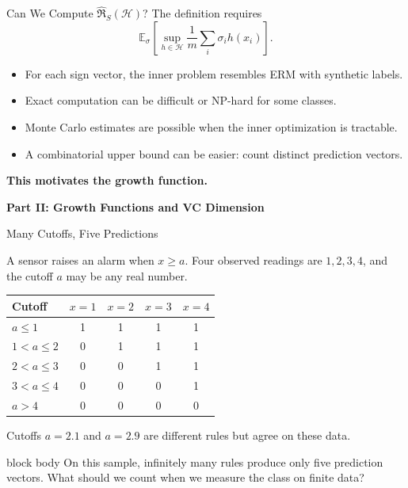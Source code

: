 \documentclass[aspectratio=169,10pt]{beamer}
\newcommand{\Hc}{\mathcal{H}}
\newcommand{\RadS}{\widehat{\mathfrak{R}}_S}
\newcommand{\E}{\mathbb{E}}
\newcommand{\SectionSlide}[2]{%
  \begin{frame}
    \centering
    \vfill
    {\color{slideorange}\fontsize{29}{34}\selectfont\bfseries #1\par}
    \vspace{0.38cm}
    {\color{midgray}\fontsize{16}{21}\selectfont #2\par}
    \vfill
  \end{frame}
}
\newcommand{\KeyBox}[1]{%
  \begin{beamercolorbox}[rounded=true,sep=0.22cm,wd=\linewidth]{block body}
    #1
  \end{beamercolorbox}%
}
\begin{document}
\begin{frame}[t]{Can We Compute $\RadS(\Hc)$?}
  \vspace{0.05cm}
  The definition requires
  \[
    \E_\sigma\left[
      \sup_{h\in\Hc}\frac1m\sum_i\sigma_i h(x_i)
    \right].
  \]
  \begin{itemize}
    \setlength{\itemsep}{0.14cm}
    \item For each sign vector, the inner problem resembles ERM with synthetic labels.
    \item Exact computation can be difficult or NP-hard for some classes.
    \item Monte Carlo estimates are possible when the inner optimization is tractable.
    \item A combinatorial upper bound can be easier: count distinct prediction vectors.
  \end{itemize}
  \vspace{0.08cm}
  \centering
  \textbf{This motivates the growth function.}
\end{frame}



\SectionSlide{Part II: Growth Functions and VC Dimension}{}

\begin{frame}[t]{Many Cutoffs, Five Predictions}
  \vspace{0.04cm}
  \small

  A sensor raises an alarm when $x\ge a$. Four observed readings are
  $1,2,3,4$, and the cutoff $a$ may be any real number.
  \begin{center}
  \renewcommand{\arraystretch}{1.15}
  \begin{tabular}{lcccc}
    \toprule
    Cutoff & $x=1$ & $x=2$ & $x=3$ & $x=4$\\
    \midrule
    $a\le1$ & 1 & 1 & 1 & 1\\
    $1<a\le2$ & 0 & 1 & 1 & 1\\
    $2<a\le3$ & 0 & 0 & 1 & 1\\
    $3<a\le4$ & 0 & 0 & 0 & 1\\
    $a>4$ & 0 & 0 & 0 & 0\\
    \bottomrule
  \end{tabular}
  \end{center}
  Cutoffs $a=2.1$ and $a=2.9$ are different rules but agree on these data.
  \vspace{0.15cm}
  \KeyBox{On this sample, infinitely many rules produce only five prediction
  vectors. What should we count when we measure the class on finite data?}

\end{frame}
\end{document}
